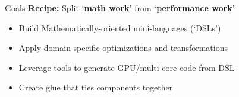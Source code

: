 \documentclass[english,compress]{beamer}
\begin{document}
\begin{frame}{Goals}
  \textbf{Recipe:} Split `\textbf{math work}' from `\textbf{performance work}'

  \bigskip
  \begin{itemize}
    \item Build Mathematically-oriented mini-languages (`DSLs')
    \item Apply domain-specific optimizations and transformations
    \item Leverage tools to generate GPU/multi-core code from DSL
    \item Create glue that ties components together
  \end{itemize}
  \uncover<+->{}
\end{frame}
\def\excl#1{{\color<2->{lightgray}#1}}
\end{document}
